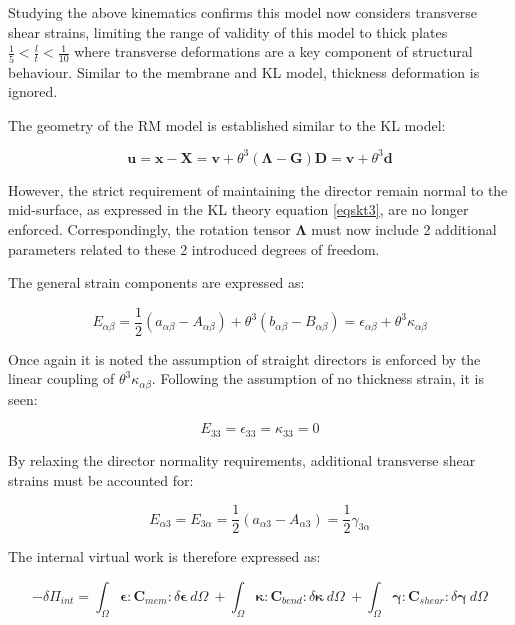 Studying the above kinematics confirms this model now considers transverse shear strains, limiting the range of validity of this model to thick plates $\frac{1}{5} < \frac{l}{t} < \frac{1}{10}$ where transverse deformations are a key component of structural behaviour. Similar to the membrane and KL model, thickness deformation is ignored.

The geometry of the RM model is established similar to the KL model:

\begin{equation} 
\mathbf{u} = \mathbf{x} - \mathbf{X}
=
\mathbf{v} + \theta^3 (\boldsymbol{\Lambda} - \mathbf{G}) \mathbf{D}
=
\mathbf{v} + \theta^3 \mathbf{d}
\label{eqsrm1}
\end{equation}

However, the strict requirement of maintaining the director remain normal to the mid-surface, as expressed in the KL theory equation \eqref{eqskt3}, are no longer enforced. Correspondingly, the rotation tensor $\boldsymbol{\Lambda}$ must now include 2 additional parameters related to these 2 introduced degrees of freedom.

The general strain components are expressed as:

\begin{equation} 
E_{\alpha \beta}
= \frac{1}{2}
(a_{\alpha\beta} - A_{\alpha\beta})
+
\theta^3 (b_{\alpha\beta} - B_{\alpha\beta})
=
\epsilon_{\alpha \beta} + \theta^3 \kappa_{\alpha \beta}
\label{eqsrm2}
\end{equation}

Once again it is noted the assumption of straight directors is enforced by the linear coupling of $\theta^3 \kappa_{\alpha \beta}$. Following the assumption of no thickness strain, it is seen:

\begin{equation} 
E_{33} = \epsilon_{33} = \kappa_{33} = 0
\label{eqsrm21}
\end{equation}

By relaxing the director normality requirements, additional transverse shear strains must be accounted for:

\begin{equation} 
E_{\alpha 3} = E_{3 \alpha}
= \frac{1}{2}
(a_{\alpha 3} - A_{\alpha 3})
=
\frac{1}{2} \gamma_{3\alpha}
\label{eqsrm3}
\end{equation}

The internal virtual work is therefore expressed as:

\begin{equation} 
-\delta\Pi_{int} =
\int_\Omega
\boldsymbol{\epsilon}
:
\mathbf{C}_{mem}
:
\delta \boldsymbol{\epsilon}\ d \Omega\ 
+
\int_\Omega
\boldsymbol{\kappa}
:
\mathbf{C}_{bend}
:
\delta \boldsymbol{\kappa}\ 
d \Omega\ 
+
\int_\Omega
\boldsymbol{\gamma}
:
\mathbf{C}_{shear}
:
\delta \boldsymbol{\gamma}\ 
d \Omega
\label{eqsrm4}
\end{equation}

